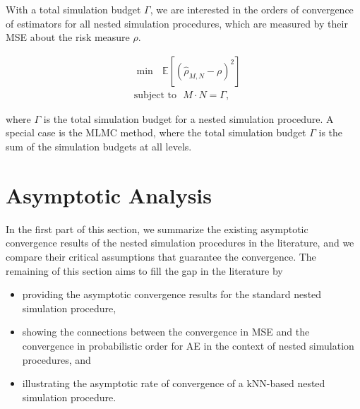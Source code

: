 With a total simulation budget $\Gamma$, we are interested in the orders of convergence of estimators for all nested simulation procedures, which are measured by their MSE about the risk measure $\rho$.

\begin{align}
    & \min ~~~ \mathbb{E} \left[ \left( \hat{\rho}_{M, N} - \rho \right)^2 \right] \nonumber \\
    & \text{subject to} ~~~ M \cdot N = \Gamma, 
\end{align}

where $\Gamma$ is the total simulation budget for a nested simulation procedure.
A special case is the MLMC method, where the total simulation budget $\Gamma$ is the sum of the simulation budgets at all levels.

\section{Asymptotic Analysis} \label{sec1:asymptotic-convergence}
In the first part of this section, we summarize the existing asymptotic convergence results of the nested simulation procedures in the literature, and we compare their critical assumptions that guarantee the convergence.
The remaining of this section aims to fill the gap in the literature by
\begin{itemize}
    \item providing the asymptotic convergence results for the standard nested simulation procedure, 
    \item showing the connections between the convergence in MSE and the convergence in probabilistic order for AE in the context of nested simulation procedures, and
    \item illustrating the asymptotic rate of convergence of a kNN-based nested simulation procedure.
\end{itemize}

